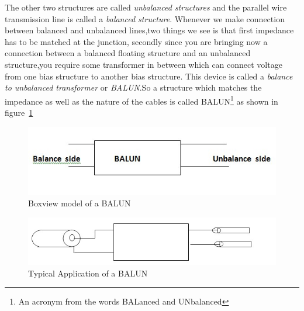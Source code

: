 The other two structures are called \emph{unbalanced structures} and the parallel wire transmission line is called a \emph{balanced structure}. Whenever we make connection between balanced and unbalanced lines,two things we see is that first impedance has to be matched at the junction, secondly since you are bringing now a connection between a balanced floating structure and an unbalanced structure,you require some transformer in between which can connect voltage from one bias structure to another bias structure. This device is called a \emph{balance to unbalanced transformer} or \emph{BALUN}.So a structure which matches the impedance as well as the nature of the cables is called BALUN\footnote{
An acronym from the words BALanced and UNbalanced
} as shown in figure~\ref{fig:balun}
\begin{figure}[h]
\centering
\includegraphics[width=1\linewidth]{graphics/balun}
\caption{Boxview model of a BALUN}
\label{fig:balun}
\end{figure}
\begin{figure}[h]
\centering
\includegraphics[width=1\linewidth]{graphics/balun2}
\caption{Typical Application of a BALUN}
\label{fig:balun2}
\end{figure}

